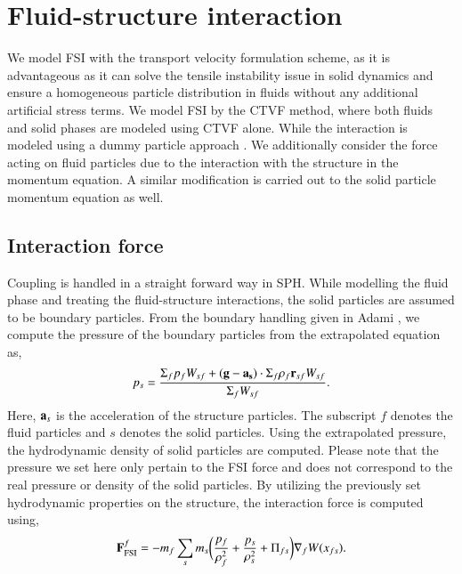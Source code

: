 \chapter{Fluid-structure interaction}
\label{sec:fsi}
We model FSI with the transport velocity formulation scheme, as it is
advantageous as it can solve the tensile instability issue in solid dynamics and
ensure a homogeneous particle distribution in fluids without any additional
artificial stress terms. We model FSI by the CTVF method, where both fluids and
solid phases are modeled using CTVF alone. While the interaction is modeled
using a dummy particle approach \citep{Adami2012}. We additionally consider the
force acting on fluid particles due to the interaction with the structure in the
momentum equation. A similar modification is carried out to the solid particle
momentum equation as well.

\section{Interaction force}\label{subsec:fsi}
Coupling is handled in a straight forward way in SPH. While modelling the fluid
phase and treating the fluid-structure interactions, the solid particles are
assumed to be boundary particles. From the boundary handling given in Adami
\citep{Adami2012}, we compute the pressure of the boundary particles from
the extrapolated equation as,
\begin{equation}
  \label{eq:fsi:pressure-bc}
  p_s = \frac{\Sigma_f p_f W_{sf} + (\mathbf{g} - \mathbf{a}_{\mathbf{s}}) \cdot \Sigma_f
    \rho_f \mathbf{r}_{sf} W_{sf}}{\Sigma_f W_{sf}}.
\end{equation}
Here, $\mathbf{a}_s$ is the acceleration of the structure particles. The subscript
$f$ denotes the fluid particles and $s$ denotes the solid particles. Using the
extrapolated pressure, the hydrodynamic density of solid particles are
computed. Please note that the pressure we set here only pertain to the
FSI force and does not correspond to the real pressure or density of the
solid particles. By utilizing the previously set hydrodynamic properties on
the structure, the interaction force is computed using,
\begin{equation}
  \mathbf{F}_{\text{FSI}}^f = -m_f \sum_{s} m_s \bigg(\frac{p_f}{\rho_{f}^2} +
  \frac{p_s}{\rho_{s}^2} + \Pi_{fs} \bigg) \nabla_{f} W(x_{fs}).
\end{equation}


